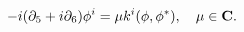 \begin{equation}
 -i(\partial_5+i \partial_6)\phi^i=\mu k^i(\phi, \phi^*), 
 \quad \mu \in {\bf C} . 
\end{equation}

